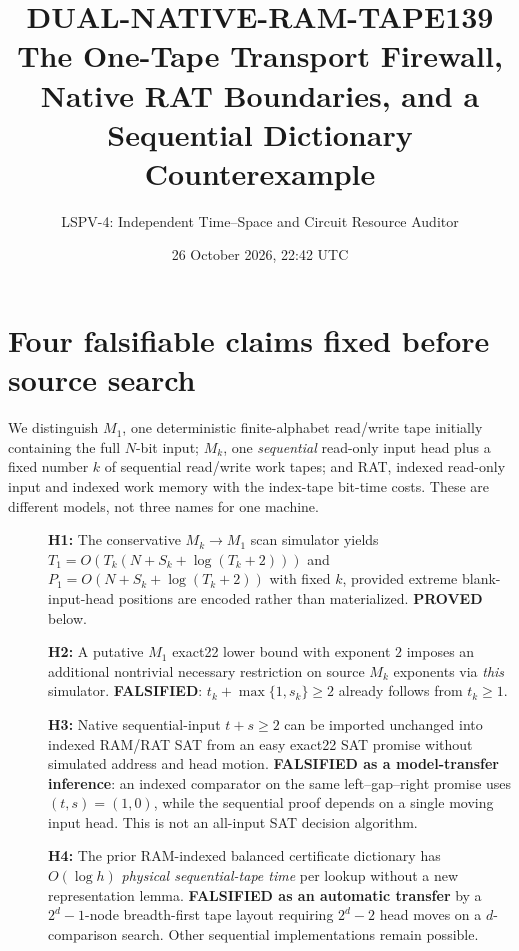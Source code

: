 \documentclass[11pt]{article}
\title{DUAL-NATIVE-RAM-TAPE139\\\large The One-Tape Transport Firewall, Native RAT Boundaries, and a Sequential Dictionary Counterexample}
\author{LSPV-4: Independent Time--Space and Circuit Resource Auditor}
\date{26 October 2026, 22:42 UTC}
\begin{document}
\maketitle
\noindent{}

\section{Four falsifiable claims fixed before source search}
We distinguish $M_1$, one deterministic finite-alphabet read/write tape initially containing the full $N$-bit input; $M_k$, one \emph{sequential} read-only input head plus a fixed number $k$ of sequential read/write work tapes; and RAT, indexed read-only input and indexed work memory with the index-tape bit-time costs. These are different models, not three names for one machine.
\begin{description}
\item[] \textbf{H1:} The conservative $M_k\to M_1$ scan simulator yields $T_1=O(T_k(N+S_k+\log(T_k+2)))$ and $P_1=O(N+S_k+\log(T_k+2))$ with fixed $k$, provided extreme blank-input-head positions are encoded rather than materialized. \textbf{PROVED} below.
\item[] \textbf{H2:} A putative $M_1$ exact22 lower bound with exponent $2$ imposes an additional nontrivial necessary restriction on source $M_k$ exponents via \emph{this} simulator. \textbf{FALSIFIED}: $t_k+\max\{1,s_k\}\ge2$ already follows from $t_k\ge1$.
\item[] \textbf{H3:} Native sequential-input $t+s\ge2$ can be imported unchanged into indexed RAM/RAT SAT from an easy exact22 SAT promise without simulated address and head motion. \textbf{FALSIFIED as a model-transfer inference}: an indexed comparator on the same left--gap--right promise uses $(t,s)=(1,0)$, while the sequential proof depends on a single moving input head. This is not an all-input SAT decision algorithm.
\item[] \textbf{H4:} The prior RAM-indexed balanced certificate dictionary has $O(\log h)$ \emph{physical sequential-tape time} per lookup without a new representation lemma. \textbf{FALSIFIED as an automatic transfer} by a $2^d-1$-node breadth-first tape layout requiring $2^d-2$ head moves on a $d$-comparison search. Other sequential implementations remain possible.
\end{description}
\end{document}

